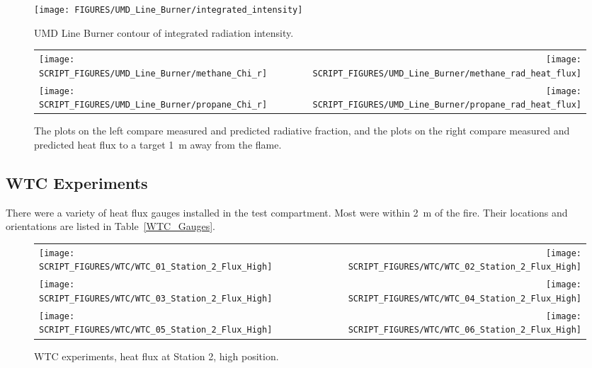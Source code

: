 \begin{figure}[h!]
\centering
\texttt{[image: FIGURES/UMD\_Line\_Burner/integrated\_intensity]}
\caption[UMD Line Burner contour of integrated radiation intensity]{UMD Line Burner contour of integrated radiation intensity.}
\label{fig_umd_integrated_intensity}
\end{figure}

\begin{figure}[h!]
\begin{tabular*}{\textwidth}{l@{\extracolsep{\fill}}r}
\texttt{[image: SCRIPT\_FIGURES/UMD\_Line\_Burner/methane\_Chi\_r]} &
\texttt{[image: SCRIPT\_FIGURES/UMD\_Line\_Burner/methane\_rad\_heat\_flux]} \\
\texttt{[image: SCRIPT\_FIGURES/UMD\_Line\_Burner/propane\_Chi\_r]} &
\texttt{[image: SCRIPT\_FIGURES/UMD\_Line\_Burner/propane\_rad\_heat\_flux]}
\end{tabular*}
\caption[UMD Line Burner radiative fraction and radiative heat flux]{The plots on the left compare measured and predicted radiative fraction, and the plots on the right compare measured and predicted heat flux to a target 1~m away from the flame.}
\label{fig_umd_chi_r}
\end{figure}


\clearpage

\subsection{WTC Experiments}

There were a variety of heat flux gauges installed in the test compartment. Most were within 2~m of the fire. Their locations and orientations are listed in Table~\ref{WTC_Gauges}.


\begin{figure}[h!]
\begin{tabular*}{\textwidth}{l@{\extracolsep{\fill}}r}
\texttt{[image: SCRIPT\_FIGURES/WTC/WTC\_01\_Station\_2\_Flux\_High]} &
\texttt{[image: SCRIPT\_FIGURES/WTC/WTC\_02\_Station\_2\_Flux\_High]} \\
\texttt{[image: SCRIPT\_FIGURES/WTC/WTC\_03\_Station\_2\_Flux\_High]} &
\texttt{[image: SCRIPT\_FIGURES/WTC/WTC\_04\_Station\_2\_Flux\_High]} \\
\texttt{[image: SCRIPT\_FIGURES/WTC/WTC\_05\_Station\_2\_Flux\_High]} &
\texttt{[image: SCRIPT\_FIGURES/WTC/WTC\_06\_Station\_2\_Flux\_High]}
\end{tabular*}
\caption[WTC experiments, heat flux at Station 2, high position]
{WTC experiments, heat flux at Station 2, high position.}
\label{NIST_WTC_Station_2_Flux_High}
\end{figure}

